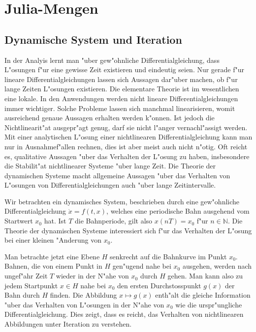 \chapter{Julia-Mengen}
\begin{refsection}

\section{Dynamische System und Iteration}
In der Analyis lernt man "uber 
gew"ohnliche Differentialgleichung, dass L"osungen f"ur eine gewisse
Zeit existieren und eindeutig seien.
Nur gerade f"ur lineare Differentialgleichungen lassen sich Aussagen 
dar"uber machen, ob f"ur lange Zeiten L"osungen existieren.
Die elementare Theorie ist im wesentlichen eine lokale.
In den Anwendungen werden nicht lineare Differentialgleichungen immer
wichtiger.
Solche Probleme lassen sich manchmal linearisieren, womit ausreichend
genaue Aussagen erhalten werden k"onnen.
Ist jedoch die Nichtlinearit"at ausgepr"agt genug, darf sie nicht l"anger
vernachl"assigt werden.
Mit einer analytischen L"osung einer nichtlinearen Differentialgleichung
kann man nur in Ausnahmef"allen rechnen, dies ist aber meist auch nicht
n"otig. Oft reicht es, qualitative Aussagen "uber das Verhalten der
L"osung zu haben,
insbesondere die Stabilit"at nichtlinearer Systeme "uber lange Zeit.
Die Theorie der dynamischen Systeme macht allgemeine Aussagen "uber das
Verhalten von L"osungen von Differentialgleichungen auch "uber lange
Zeitintervalle.

Wir betrachten ein dynamisches System, beschrieben durch eine
gew"ohnliche Differentialgleichung $\dot x= f(t,x)$, welches eine
periodische Bahn ausgehend vom Startwert $x_0$ hat.
Ist $T$ die Bahnperiode, gilt also
$x(nT)=x_0$ f"ur $n\in\mathbb N$.
Die Theorie der dynamischen Systeme interessiert sich f"ur das Verhalten
der L"osung bei einer kleinen "Anderung von $x_0$.

Man betrachte jetzt eine Ebene $H$ senkrecht auf die Bahnkurve im Punkt $x_0$.
Bahnen, die von einem Punkt in $H$ gen"ugend nahe bei $x_0$ ausgehen, werden
nach ungef"ahr Zeit $T$ wieder in der N"ahe von $x_0$ durch $H$ gehen.
Man kann also zu jedem Startpunkt $x\in H$ nahe bei $x_0$ den ersten
Durchstosspunkt $g(x)$ der Bahn durch $H$ finden.
Die Abbildung $x\mapsto g(x)$ enth"alt die gleiche Information "uber das
Verhalten von L"osungen in der N"ahe von $x_0$ wie die urspr"ungliche
Differentialgleichung.
Dies zeigt, dass es reicht, das Verhalten von nichtlinearen Abbildungen
unter Iteration zu verstehen.


\end{refsection}
